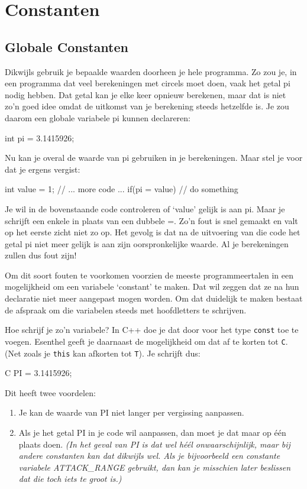 \chapter{Constanten}
\section{Globale Constanten}
Dikwijls gebruik je bepaalde waarden doorheen je hele programma. Zo zou je, in een programma dat veel berekeningen met circels moet doen, vaak het getal pi nodig hebben. Dat getal kan je elke keer opnieuw berekenen, maar dat is niet zo'n goed idee omdat de uitkomst van je berekening steeds hetzelfde is. Je zou daarom een globale variabele pi kunnen declareren:

\begin{code}
int pi = 3.1415926;
\end{code}

Nu kan je overal de waarde van pi gebruiken in je berekeningen. Maar stel je voor dat je ergens vergist:

\begin{code}
int value = 1;
// ... more code ...
if(pi = value) {
  // do something
}
\end{code}

Je wil in de bovenstaande code controleren of `value' gelijk is aan pi. Maar je schrijft een enkele in plaats van een dubbele =. Zo'n fout is snel gemaakt en valt op het eerste zicht niet zo op. Het gevolg is dat na de uitvoering van die code het getal pi niet meer gelijk is aan zijn oorspronkelijke waarde. Al je berekeningen zullen dus fout zijn!

Om dit soort fouten te voorkomen voorzien de meeste programmeertalen in een mogelijkheid om een variabele `constant' te maken. Dat wil zeggen dat ze na hun declaratie niet meer aangepast mogen worden. Om dat duidelijk te maken bestaat de afspraak om die variabelen steeds met hoofdletters te schrijven.

Hoe schrijf je zo'n variabele? In C++ doe je dat door voor het type \verb|const| toe te voegen. Esenthel geeft je daarnaast de mogelijkheid om dat af te korten tot \verb|C|. (Net zoals je \verb|this| kan afkorten tot \verb|T|). Je schrijft dus:

\begin{code}
C PI = 3.1415926;
\end{code}

Dit heeft twee voordelen:

\begin{enumerate}
	\item Je kan de waarde van PI niet langer per vergissing aanpassen.
	\item Als je het getal PI in je code wil aanpassen, dan moet je dat maar op \'e\'en plaats doen. \textsl{(In het geval van PI is dat wel h\'e\'el onwaarschijnlijk, maar bij andere constanten kan dat dikwijls wel. Als je bijvoorbeeld een constante variabele ATTACK\_RANGE gebruikt, dan kan je misschien later beslissen dat die toch iets te groot is.)} 
\end{enumerate}


